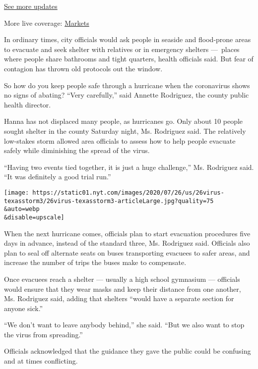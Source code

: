 \href{https://www.nytimes.com/2020/08/01/world/coronavirus-covid-19.html?action=click\&pgtype=Article\&state=default\&region=MAIN_CONTENT_1\&context=storylines_live_updates}{See
more updates}

More live coverage:
\href{https://www.nytimes.com/live/2020/07/31/business/stock-market-today-coronavirus?action=click\&pgtype=Article\&state=default\&region=MAIN_CONTENT_1\&context=storylines_live_updates}{Markets}

In ordinary times, city officials would ask people in seaside and
flood-prone areas to evacuate and seek shelter with relatives or in
emergency shelters ---~places where people share bathrooms and tight
quarters, health officials said. But fear of contagion has thrown old
protocols out the window.

So how do you keep people safe through a hurricane when the coronavirus
shows no signs of abating? ``Very carefully,'' said Annette Rodriguez,
the county public health director.

Hanna has not displaced many people, as hurricanes go. Only about 10
people sought shelter in the county Saturday night, Ms. Rodriguez said.
The relatively low-stakes storm allowed area officials to assess how to
help people evacuate safely while diminishing the spread of the virus.

``Having two events tied together, it is just a huge challenge,'' Ms.
Rodriguez said. ``It was definitely a good trial run.''

\texttt{[image: https://static01.nyt.com/images/2020/07/26/us/26virus-texasstorm3/26virus-texasstorm3-articleLarge.jpg?quality=75\\\&auto=webp\\\&disable=upscale]}

When the next hurricane comes, officials plan to start evacuation
procedures five days in advance, instead of the standard three, Ms.
Rodriguez said. Officials also plan to seal off alternate seats on buses
transporting evacuees to safer areas, and increase the number of trips
the buses make to compensate.

Once evacuees reach a shelter --- usually a high school gymnasium ---
officials would ensure that they wear masks and keep their distance from
one another, Ms. Rodriguez said, adding that shelters ``would have a
separate section for anyone sick.''

``We don't want to leave anybody behind,'' she said. ``But we also want
to stop the virus from spreading.''

Officials acknowledged that the guidance they gave the public could be
confusing and at times conflicting.

